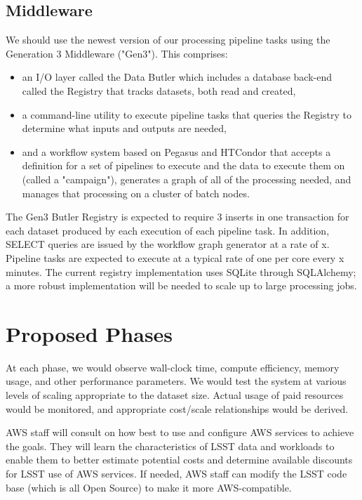 \subsection{Middleware} \label{sec:drp-middleware}
We should use the newest version of our processing pipeline tasks using the Generation 3 Middleware ("Gen3"). This comprises:
\begin{itemize}
\item an I/O layer called the Data Butler which includes a database back-end called the Registry that tracks datasets, both read and created,
\item a command-line utility to execute pipeline tasks that queries the Registry to determine what inputs and outputs are needed,
\item and a workflow system based on Pegasus and HTCondor that accepts a definition for a set of pipelines to execute and the data to execute them on (called a "campaign"), generates a graph of all of the processing needed, and manages that processing on a cluster of batch nodes.
\end{itemize}

The Gen3 Butler Registry is expected to require 3 inserts in one transaction for each dataset produced by each execution of each pipeline task. In addition, SELECT queries are issued by the workflow graph generator at a rate of x. Pipeline tasks are expected to execute at a typical rate of one per core every x minutes. The current registry implementation uses SQLite through SQLAlchemy; a more robust implementation will be needed to scale up to large processing jobs. 

\section{Proposed Phases} \label{sec:phases}
At each phase, we would observe wall-clock time, compute efficiency, memory usage, and other performance parameters. We would test the system at various levels of scaling appropriate to the dataset size. Actual usage of paid resources would be monitored, and appropriate cost/scale relationships would be derived.

AWS staff will consult on how best to use and configure AWS services to achieve the goals. They will learn the characteristics of LSST data and workloads to enable them to better estimate potential costs and determine available discounts for LSST use of AWS services. If needed, AWS staff can modify the LSST code base (which is all Open Source) to make it more AWS-compatible.

